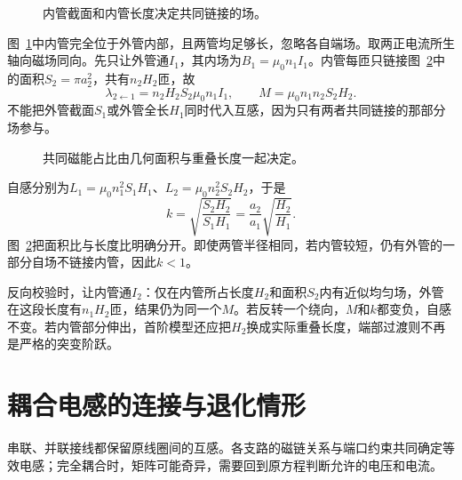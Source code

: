 \begin{figure}[H]\centering
{}
\caption{内管截面和内管长度决定共同链接的场。}\label{fig:i2-e5-q}
\end{figure}
\begin{solution}
图~\ref{fig:i2-e5-q}中内管完全位于外管内部，且两管均足够长，忽略各自端场。取两正电流所生轴向磁场同向。先只让外管通$I_1$，其内场为$B_1=\mu_0n_1I_1$。内管每匝只链接图~\ref{fig:i2-e5-s}中的面积$S_2=\pi a_2^2$，共有$n_2H_2$匝，故
\[\lambda_{2\leftarrow1}=n_2H_2S_2\mu_0n_1I_1,\qquad
\boxed{M=\mu_0n_1n_2S_2H_2}.
\]
不能把外管截面$S_1$或外管全长$H_1$同时代入互感，因为只有两者共同链接的那部分场参与。


\begin{figure}[H]\centering
{}
\caption{共同磁能占比由几何面积与重叠长度一起决定。}\label{fig:i2-e5-s}
\end{figure}

自感分别为$L_1=\mu_0n_1^2S_1H_1$、$L_2=\mu_0n_2^2S_2H_2$，于是
\[\boxed{k=\sqrt{\frac{S_2H_2}{S_1H_1}}
=\frac{a_2}{a_1}\sqrt{\frac{H_2}{H_1}}}.
\]
图~\ref{fig:i2-e5-s}把面积比与长度比明确分开。即使两管半径相同，若内管较短，仍有外管的一部分自场不链接内管，因此$k<1$。

反向校验时，让内管通$I_2$：仅在内管所占长度$H_2$和面积$S_2$内有近似均匀场，外管在这段长度有$n_1H_2$匝，结果仍为同一个$M$。若反转一个绕向，$M$和$k$都变负，自感不变。若内管部分伸出，首阶模型还应把$H_2$换成实际重叠长度，端部过渡则不再是严格的突变阶跃。
\end{solution}


\section{耦合电感的连接与退化情形}\label{sec:i2-circuit}
串联、并联接线都保留原线圈间的互感。各支路的磁链关系与端口约束共同确定等效电感；完全耦合时，矩阵可能奇异，需要回到原方程判断允许的电压和电流。

